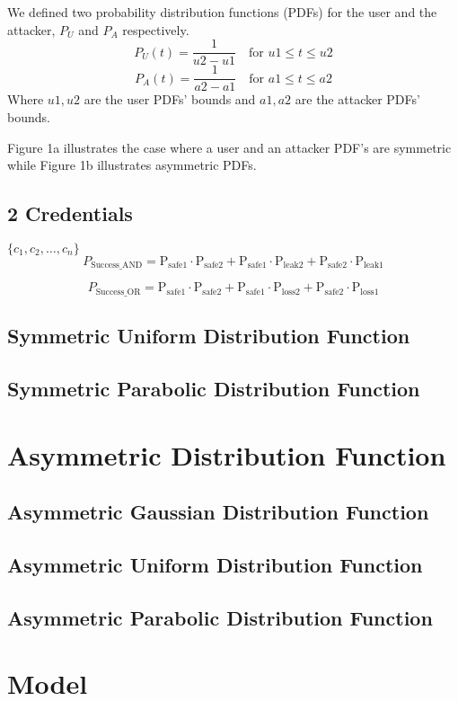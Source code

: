 \documentclass{article}
\begin{document}
We defined two probability distribution functions (PDFs) for the user and the attacker, $P_U$ and $P_A$ respectively.
\[
P_U(t) = \frac{1}{u2-u1} \quad \text{for } u1 \leq t \leq u2
\]
\[
P_A(t) = \frac{1}{a2-a1} \quad \text{for } a1 \leq t \leq a2
\]
Where $u1, u2$ are the user PDFs' bounds and $a1, a2$ are the attacker PDFs' bounds.

Figure 1a illustrates the case where a user and an attacker PDF's are symmetric while Figure 1b illustrates asymmetric PDFs.

\subsection{2 Credentials}
$\{c_1, c_2, \ldots, c_n\}$
\[
P_{\text{Success\_AND}} = \mathrm{P_{\text{safe1}}} \cdot \mathrm{P_{\text{safe2}}} + \mathrm{P_{\text{safe1}}} \cdot \mathrm{P_{\text{leak2}}} + \mathrm{P_{\text{safe2}}} \cdot \mathrm{P_{\text{leak1}}}
\]

\[
P_{\text{Success\_OR}} = \mathrm{P_{\text{safe1}}} \cdot \mathrm{P_{\text{safe2}}} + \mathrm{P_{\text{safe1}}} \cdot \mathrm{P_{\text{loss2}}} + \mathrm{P_{\text{safe2}}} \cdot \mathrm{P_{\text{loss1}}}
\]
\subsection{Symmetric Uniform Distribution Function}
\subsection{Symmetric Parabolic Distribution Function}
\section{Asymmetric Distribution Function}
\subsection{Asymmetric Gaussian Distribution Function}
\subsection{Asymmetric Uniform Distribution Function}
\subsection{Asymmetric Parabolic Distribution Function}
\section{Model}
\end{document}
